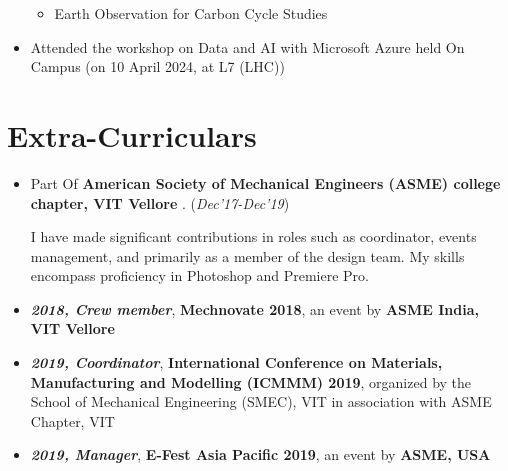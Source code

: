 \documentclass[10.8pt, a4paper]{extarticle}
\newcommand{\shorterSection}[1]{\vspace{-10pt}\section{#1}}
\begin{document}
\begin{itemize}
\begin{itemize}
    \item Earth Observation for Carbon Cycle Studies \href{https://drive.google.com/file/d/1SYKP6BzNcmPcVS8MiXt31NDexVP9gFDn/view?usp=sharing}{\faLink{}}
    
\end{itemize} 

  \item Attended the workshop on Data and AI with Microsoft Azure held On Campus (on 10 April 2024, at L7 (LHC))\\[-0.6cm]
  
\vspace{4mm}
\end{itemize}
\vspace{4mm}

\shorterSection{Extra-Curriculars}
\begin{itemize}
\item Part Of \textbf{American Society of Mechanical Engineers (ASME) college chapter, VIT Vellore }. \href{https://m.facebook.com/story.php?story_fbid=pfbid02PFELcj2eSP5jKHCXbLVLbEHxS8VHwkXKTn5VppoYcqn2MsAU6kcHg1noYHc1g59Yl&id=406549079357847&mibextid=Nif5oz}{\faLink{}} \hfill\hfill(\textit{Dec'17-Dec'19}) 

I have made significant contributions in roles such as coordinator, events management, and primarily as a member of the design team. My skills encompass proficiency in Photoshop and Premiere Pro.

\item \textit{\textbf{2018, Crew member}}, \textbf{Mechnovate 2018}, an event by \textbf{ASME India, VIT Vellore} \href{https://drive.google.com/file/d/1skeeRg3UISDUtRxwI7Nfen7c6zbsuysX/view?usp=sharing}{\faLink{}}

\item \textit{\textbf{2019, Coordinator}}, \textbf{International Conference on Materials, Manufacturing and Modelling (ICMMM) 2019}, organized by the School of Mechanical Engineering (SMEC), VIT in association with ASME Chapter, VIT \href{https://drive.google.com/file/d/1skeeRg3UISDUtRxwI7Nfen7c6zbsuysX/view?usp=sharing}{\faLink{}}

\item \textit{\textbf{2019, Manager}}, \textbf{E-Fest Asia Pacific 2019}, an event by \textbf{ASME, USA} \href{https://drive.google.com/file/d/1skeeRg3UISDUtRxwI7Nfen7c6zbsuysX/view?usp=sharing}{\faLink{}} \href{https://efests.asme.org/gallery/images/e-fest-asia-pacific-2019}{\faLink{}}

\vspace{4mm}
\end{itemize}
\vspace{4mm}
\end{document}
